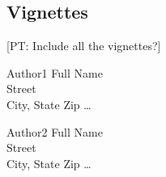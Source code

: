 \documentclass{sp}
\newcommand{\pt}[1]{\textcolor{Cerulean}{[PT: #1]}}
\begin{document}
\subsection{Vignettes}
\pt{Include all the vignettes?}



\begin{addresses}
  \begin{address}
    Author1 Full Name \\
    Street \\
    City, State Zip \ldots \\
  \end{address}
  \begin{address}
    Author2 Full Name \\
    Street \\
    City, State Zip \dots \\
  \end{address}
\end{addresses}
\end{document}
